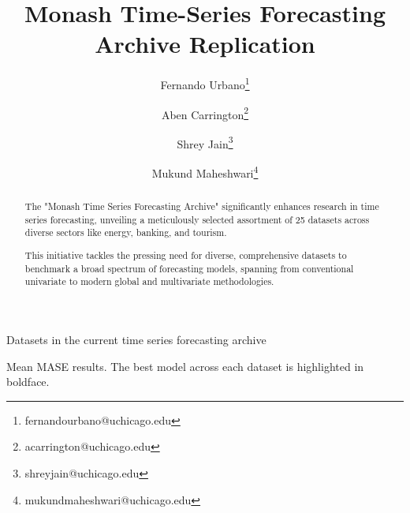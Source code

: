 \newcommand*{\MyHeaderPath}{.}%
\newcommand*{\PathToAssets}{../assets}%
\newcommand*{\PathToOutput}{../output/}%
\newcommand*{\PathToOutputTables}{../output/tables}%









\begin{titlepage}
\title{Monash Time-Series Forecasting Archive Replication}
\author{
    Fernando Urbano\footnote{fernandourbano@uchicago.edu} \and
    Aben Carrington\footnote{acarrington@uchicago.edu} \and
    Shrey Jain\footnote{shreyjain@uchicago.edu} \and
    Mukund Maheshwari\footnote{mukundmaheshwari@uchicago.edu}
}
\maketitle

\doublespacing
\begin{abstract}
The "Monash Time Series Forecasting Archive" significantly enhances research in time series forecasting, unveiling a meticulously selected assortment of 25 datasets across diverse sectors like energy, banking, and tourism.

This initiative tackles the pressing need for diverse, comprehensive datasets to benchmark a broad spectrum of forecasting models, spanning from conventional univariate to modern global and multivariate methodologies.
\end{abstract}
\end{titlepage}

\begin{table}[H]
    \caption{Datasets in the current time series forecasting archive}
    \centering
    \resizebox{\textwidth}{!}{
    
    }
    \label{table:table1.tex}
\end{table}

\begin{table}[H]
    \caption{Mean MASE results. The best model across each dataset is highlighted in boldface.}
    \centering
    \resizebox{\textwidth}{!}{
    
    }
    \label{table:table2.tex}
\end{table}

